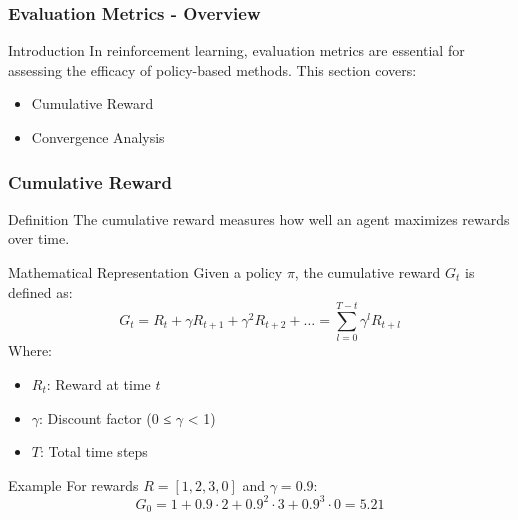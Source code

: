\documentclass[aspectratio=169]{beamer}
\begin{document}
\begin{frame}[fragile]
    \frametitle{Evaluation Metrics - Overview}
    \begin{block}{Introduction}
        In reinforcement learning, evaluation metrics are essential for assessing the efficacy of policy-based methods. This section covers:
        \begin{itemize}
            \item Cumulative Reward
            \item Convergence Analysis
        \end{itemize}
    \end{block}
\end{frame}

\begin{frame}[fragile]
    \frametitle{Cumulative Reward}
    \begin{block}{Definition}
        The cumulative reward measures how well an agent maximizes rewards over time.
    \end{block}

    \begin{block}{Mathematical Representation}
        Given a policy \( \pi \), the cumulative reward \( G_t \) is defined as:
        \begin{equation}
        G_t = R_t + \gamma R_{t+1} + \gamma^2 R_{t+2} + \ldots = \sum_{l=0}^{T-t} \gamma^l R_{t+l}
        \end{equation}
        Where:
        \begin{itemize}
            \item \( R_t \): Reward at time \( t \)
            \item \( \gamma \): Discount factor (0 ≤ \( \gamma \) < 1)
            \item \( T \): Total time steps
        \end{itemize}
    \end{block}
    
    \begin{block}{Example}
        For rewards \( R = [1, 2, 3, 0] \) and \( \gamma = 0.9 \):
        \begin{equation}
        G_0 = 1 + 0.9 \cdot 2 + 0.9^2 \cdot 3 + 0.9^3 \cdot 0 = 5.21
        \end{equation}
    \end{block}
\end{frame}
\end{document}
